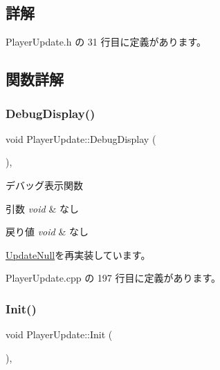 \subsection{詳解}


 Player\+Update.\+h の 31 行目に定義があります。



\subsection{関数詳解}
\mbox{\label{class_player_update_ac15fd0faf356c6e66f6c62c2b6b8d3ac}} 
\subsubsection{\texorpdfstring{Debug\+Display()}{DebugDisplay()}}
{\footnotesize\ttfamily void Player\+Update\+::\+Debug\+Display (\begin{DoxyParamCaption}{ }\end{DoxyParamCaption})\hspace{0.3cm}{\ttfamily [override]}, {\ttfamily [virtual]}}



デバッグ表示関数 


\begin{DoxyParams}{引数}
{\em void} & なし \\
\hline
\end{DoxyParams}

\begin{DoxyRetVals}{戻り値}
{\em void} & なし \\
\hline
\end{DoxyRetVals}


\mbox{\hyperlink{class_update_null_a98c7241e5ef276510830eb6df9ed0fbb}{Update\+Null}}を再実装しています。



 Player\+Update.\+cpp の 197 行目に定義があります。

\mbox{\label{class_player_update_ac72b39db7b7bfaf094bde9ed1adef4b7}} 
\subsubsection{\texorpdfstring{Init()}{Init()}}
{\footnotesize\ttfamily void Player\+Update\+::\+Init (\begin{DoxyParamCaption}{ }\end{DoxyParamCaption})\hspace{0.3cm}{\ttfamily [override]}, {\ttfamily [virtual]}}



